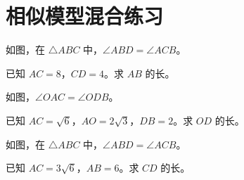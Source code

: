\documentclass{exam-zh}
\begin{document}
\section*{相似模型混合练习}


\begin{problem}[points=10]
  \noindent
  \begin{minipage}[t]{\dimexpr\linewidth-60mm-6mm\relax}
    \vspace{0pt}
    如图，在 $\triangle ABC$ 中，$\angle ABD=\angle ACB$。

已知 $AC=8$，$CD=4$。求 $AB$ 的长。
    
  \end{minipage}\hfill
  \begin{diagramcoltikz}{60mm}{}
  }
  \end{diagramcoltikz}
  \par\medskip
  \answerarea[54mm]
\end{problem}



\begin{problem}[points=10]
  \noindent
  \begin{minipage}[t]{\dimexpr\linewidth-60mm-6mm\relax}
    \vspace{0pt}
    如图，$\angle OAC=\angle ODB$。

已知 $AC=\sqrt{6}$，$AO=2\sqrt{3}$，$DB=2$。求 $OD$ 的长。
    
  \end{minipage}\hfill
  \begin{diagramcoltikz}{60mm}{}
  }
  \end{diagramcoltikz}
  \par\medskip
  \answerarea[54mm]
\end{problem}



\begin{problem}[points=10]
  \noindent
  \begin{minipage}[t]{\dimexpr\linewidth-60mm-6mm\relax}
    \vspace{0pt}
    如图，在 $\triangle ABC$ 中，$\angle ABD=\angle ACB$。

已知 $AC=3\sqrt{6}$，$AB=6$。求 $CD$ 的长。
    
  \end{minipage}\hfill
  \begin{diagramcoltikz}{60mm}{}
  }
  \end{diagramcoltikz}
  \par\medskip
  \answerarea[54mm]
\end{problem}
\end{document}
